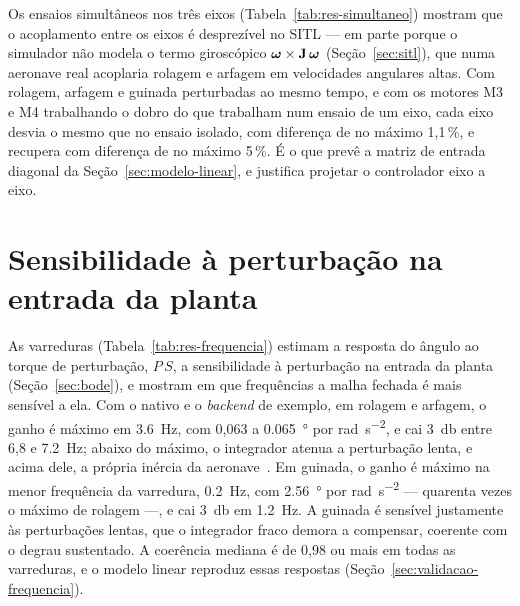 Os ensaios simultâneos nos três eixos (Tabela~\ref{tab:res-simultaneo})
mostram que o acoplamento entre os eixos é desprezível no SITL --- em parte
porque o simulador não modela o termo giroscópico
$\bm{\omega}\times\mathbf{J}\,\bm{\omega}$ (Seção~\ref{sec:sitl}),
que numa aeronave real acoplaria rolagem e arfagem em velocidades angulares
altas. Com rolagem,
arfagem e guinada perturbadas ao mesmo tempo, e com os motores M3 e M4
trabalhando o dobro do que trabalham num ensaio de um eixo, cada eixo desvia
o mesmo que no ensaio isolado, com diferença de no máximo 1,1\,\%, e
recupera com diferença de no máximo 5\,\%. É o que prevê a matriz de entrada
diagonal da Seção~\ref{sec:modelo-linear}, e justifica projetar o
controlador eixo a eixo.

\section{Sensibilidade à perturbação na entrada da planta}
\label{sec:res-frequencia}

\begin{table}[htbp]
\centering
\caption{Resposta em frequência do torque para o ângulo, nas varreduras de
torque.}
\label{tab:res-frequencia}
\small
\resizebox{\textwidth}{!}{}

\end{table}

As varreduras (Tabela~\ref{tab:res-frequencia}) estimam a resposta do ângulo
ao torque de perturbação, $P\,S$, a sensibilidade à perturbação na entrada da
planta (Seção~\ref{sec:bode}), e mostram em que frequências a malha fechada é
mais sensível a ela. Com o nativo e o \textit{backend} de exemplo, em rolagem
e arfagem, o ganho é máximo em \SI{3.6}{\hertz}, com 0,063 a
\SI{0.065}{\degree} por \si{\radian\per\second\squared}, e cai
\SI{3}{\decibel} entre 6,8 e \SI{7.2}{\hertz}; abaixo do máximo, o integrador
atenua a perturbação lenta, e acima dele, a própria inércia da
aeronave~\cite[seção~11.3]{astrom2008}. Em guinada, o ganho é máximo na menor
frequência da varredura, \SI{0.2}{\hertz}, com \SI{2.56}{\degree} por
\si{\radian\per\second\squared} --- quarenta vezes o máximo de rolagem ---, e
cai \SI{3}{\decibel} em \SI{1.2}{\hertz}. A guinada é sensível justamente às
perturbações lentas, que o integrador fraco demora a compensar, coerente com
o degrau sustentado. A coerência mediana é de 0,98 ou mais em todas as
varreduras, e o modelo linear reproduz essas respostas
(Seção~\ref{sec:validacao-frequencia}).

